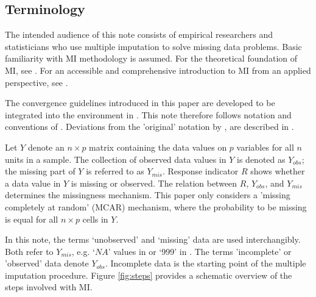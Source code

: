 \documentclass[article]{jss}
\begin{document}
\subsection{Terminology} \label{sec:terms}

The intended audience of this note consists of empirical researchers and statisticians who use multiple imputation to solve missing data problems. Basic familiarity with MI methodology is assumed. For the theoretical foundation of MI, see \cite{rubin87}. For an accessible and comprehensive introduction to MI from an applied perspective, see \cite{buur18}.  

The convergence guidelines introduced in this paper are developed to be integrated into the  environment \citep{mice} in  \citep{R}. This note therefore follows notation and conventions of \cite{mice}. Deviations from the 'original' notation by \cite{rubin87}, are described in \citep[\S~XYZ]{buur18}. 

Let $Y$ denote an $n \times p$ matrix containing the data values on $p$ variables for all $n$ units in a sample. The collection of observed data values in $Y$ is denoted as $Y_{obs}$; the missing part of $Y$ is referred to as $Y_{mis}$. Response indicator $R$ shows whether a data value in $Y$ is missing or observed. The relation between $R$, $Y_{obs}$, and $Y_{mis}$ determines the missingness mechanism. This paper only considers a 'missing completely at random' (MCAR) mechanism, where the probability to be missing is equal for all $n \times p$ cells in $Y$.

In this note, the terms `unobserved' and `missing' data are used interchangibly. Both refer to $Y_{mis}$, e.g. `$NA$' values in  or `999' in . The terms 'incomplete' or 'observed' data denote $Y_{obs}$. Incomplete data is the starting point of the multiple imputation procedure. Figure \ref{fig:steps} provides a schematic overview of the steps involved with MI.
\end{document}
